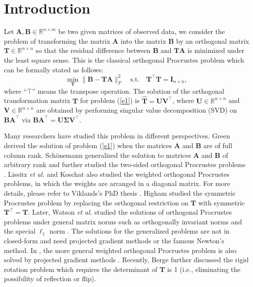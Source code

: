 \documentclass[titlepage,11pt,twoside]{article}
\begin{document}
\section{Introduction}
Let $\mathbf{A},\mathbf{B}\in\mathbb{R}^{n\times m}$ be two given matrices of observed data, we consider the problem of transforming the matrix $\mathbf{A}$ into the matrix $\mathbf{B}$ by an orthogonal matrix $\mathbf{T}\in\mathbb{R}^{n\times n}$ so that the residual difference between $\mathbf{B}$ and $\mathbf{T}\mathbf{A}$ is minimized under the least square sense. This is the classical orthogonal Procrustes problem \cite{procrustesprogram} which can be formally stated as follows:
\begin{equation}\label{e1}
\min_{\mathbf{T}}\|\mathbf{B}-\mathbf{T}\mathbf{A}\|_{F}^{2}
\quad
\text{s.t.}
\quad
\mathbf{T}^{\top}\mathbf{T} = \mathbf{I}_{n\times n},
\end{equation}
where ``$\top$'' means the transpose operation. The solution of the orthogonal transformation matrix $\mathbf{T}$ for problem (\ref{e1}) is
$\mathbf{\hat{T}}=\mathbf{U}\mathbf{V}^{\top}$, where $\mathbf{U}\in\mathbb{R}^{n\times n}$ and $\mathbf{V}\in\mathbb{R}^{n\times n}$ are obtained by performing singular value decomposition (SVD) on $\mathbf{B}\mathbf{A}^{\top}$ via $\mathbf{B}\mathbf{A}^{\top}=\mathbf{U}\mathbf{\Sigma}\mathbf{V}^{\top}$.

Many researchers have studied this problem in different perspectives. Green \cite{green1952orthogonal} derived the solution of problem (\ref{e1}) when the matrices $\mathbf{A}$ and $\mathbf{B}$ are of full column rank. Sch{\"o}nemann \cite{schonemann1966generalized} generalized the solution to matrices $\mathbf{A}$ and $\mathbf{B}$ of arbitrary rank and further studied the two-sided orthogonal Procrustes problems \cite{schonemann1968two}. Lissitz \emph{et al.} \cite{Lissitz1976} and Koschat \cite{Koschat1991} also studied the weighted orthogonal Procrustes problems, in which the weights are arranged in a diagonal matrix. For more details, please refer to Viklands's PhD thesis \cite{viklands2006algorithms}. Higham \cite{higham1988symmetric} studied the symmetric Procrustes problem by replacing the orthogonal restriction on $\mathbf{T}$ with symmetric $\mathbf{T}^{\top}=\mathbf{T}$. Later, Watson \emph{et al.} studied the solutions of orthogonal Procrustes problems under general matrix norms such as orthogonally invariant norms \cite{Watson1994} and the special $\ell_{1}$ norm \cite{trendafilov2004l1}. The solutions for the generalized problems are not in closed-form and need projected gradient methods \cite{chu1990projected} or the famous Newton's method. In \cite{trendafilov2004l1}, the more general weighted orthogonal Procrustes problem is also solved by projected gradient methods \cite{chu1990projected}. Recently, Berge \cite{Berge2006} further discussed the rigid rotation problem which requires the determinant of $\mathbf{T}$ is 1 (i.e., eliminating the possibility of reflection or flip).
\end{document}
